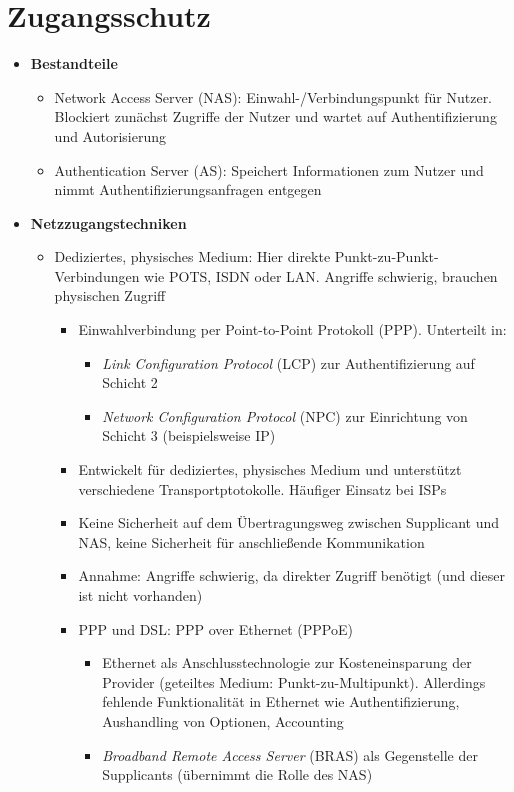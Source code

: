 \section{Zugangsschutz}
\begin{itemize}
	\item \textbf{Bestandteile}
	\begin{itemize}
		\item Network Access Server (NAS): Einwahl-/Verbindungspunkt für Nutzer. Blockiert zunächst Zugriffe der Nutzer und wartet auf Authentifizierung und Autorisierung
		\item Authentication Server (AS): Speichert Informationen zum Nutzer und nimmt Authentifizierungsanfragen entgegen
	\end{itemize}
	\item \textbf{Netzzugangstechniken}
	\begin{itemize}
		\item Dediziertes, physisches Medium: Hier direkte Punkt-zu-Punkt-Verbindungen wie POTS, ISDN oder LAN. Angriffe schwierig, brauchen physischen Zugriff
		\begin{itemize}
			\item Einwahlverbindung per Point-to-Point Protokoll (PPP). Unterteilt in:
			\begin{itemize}
				\item \textit{Link Configuration Protocol} (LCP) zur Authentifizierung auf Schicht 2
				\item \textit{Network Configuration Protocol} (NPC) zur Einrichtung von Schicht 3 (beispielsweise IP)
			\end{itemize}
			\item Entwickelt für dediziertes, physisches Medium und unterstützt verschiedene Transportptotokolle. Häufiger Einsatz bei ISPs
			\item Keine Sicherheit auf dem Übertragungsweg zwischen Supplicant und NAS, keine Sicherheit für anschließende Kommunikation
			\item Annahme: Angriffe schwierig, da direkter Zugriff benötigt (und dieser ist nicht vorhanden)
			\item PPP und DSL: PPP over Ethernet (PPPoE)
			\begin{itemize}
				\item Ethernet als Anschlusstechnologie zur Kosteneinsparung der Provider (geteiltes Medium: Punkt-zu-Multipunkt). Allerdings fehlende Funktionalität in Ethernet wie Authentifizierung, Aushandling von Optionen, Accounting
				\item \textit{Broadband Remote Access Server} (BRAS) als Gegenstelle der Supplicants (übernimmt die Rolle des NAS)

\end{itemize}
\end{itemize}
\end{itemize}
\end{itemize}
